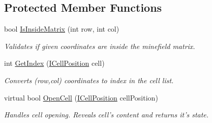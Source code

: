 \subsection*{Protected Member Functions}
\begin{DoxyCompactItemize}
\item 
bool \hyperlink{class_minesweeper_1_1_game_1_1_minefield_a1675fa664921d1110b8e2443645ce737}{Is\+Inside\+Matrix} (int row, int col)
\begin{DoxyCompactList}\small\item\em Validates if given coordinates are inside the minefield matrix. \end{DoxyCompactList}\item 
int \hyperlink{class_minesweeper_1_1_game_1_1_minefield_a18c96bbc37166965dcb92284f86cac0f}{Get\+Index} (\hyperlink{interface_minesweeper_1_1_lib_1_1_i_cell_position}{I\+Cell\+Position} cell)
\begin{DoxyCompactList}\small\item\em Converts (row,col) coordinates to index in the cell list. \end{DoxyCompactList}\item 
virtual bool \hyperlink{class_minesweeper_1_1_game_1_1_minefield_a5498de495abe8a57bc25e8a12babb08c}{Open\+Cell} (\hyperlink{interface_minesweeper_1_1_lib_1_1_i_cell_position}{I\+Cell\+Position} cell\+Position)
\begin{DoxyCompactList}\small\item\em Handles cell opening. Reveals cell's content and returns it's state. \end{DoxyCompactList}\end{DoxyCompactItemize}
